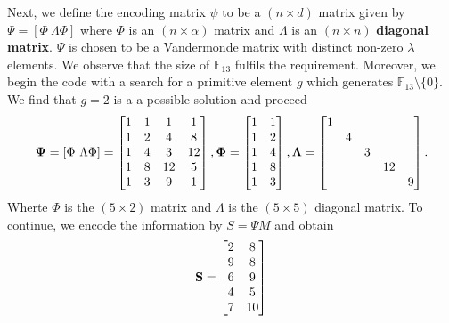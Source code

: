 \documentclass{article}
\begin{document}
Next, we define the encoding matrix $\psi $ to be a $(n\times d)$ matrix given by $\Psi = [\Phi\ \Lambda\Phi]$ where $\Phi$ is an $(n \times \alpha)$ matrix and $\Lambda$ is an $(n\times n)$ \textbf{diagonal matrix}. $\Psi$ is chosen to be a Vandermonde matrix with distinct non-zero $\lambda$ elements. We observe that the size of $\mathbb{F}_{13}$ fulfils the requirement. Moreover, we begin the code with a search for a primitive element $g$ which generates $\mathbb{F}_{13}\setminus\{0\}$. We find that $g=2$ is a a possible solution and proceed
\begin{equation*}
\vb{\Psi} = [\Phi \text{ }\Lambda\Phi] =
\begin{bmatrix}
1 & 1 & 1 & 1 \\
1 & 2 & 4 & 8 \\
1 & 4 & 3 & 12 \\
1 & 8 & 12 & 5 \\
1 & 3 & 9 & 1 
\end{bmatrix}, 
\vb{\Phi} =
\begin{bmatrix}
1 & 1\\
1 & 2\\
1 & 4\\
1 & 8\\
1 & 3
\end{bmatrix},\\
\vb{\Lambda} = 
\begin{bmatrix}
1 & & & & \\
& 4 & & & \\
& & 3 & & \\
& & & 12 & \\
& & & & 9
\end{bmatrix}.
\end{equation*}
Wherte $\Phi$  is the $(5 \times 2)$ matrix and $\Lambda$ is the $(5 \times 5)$ diagonal matrix. To continue, we encode the information by $S=\Psi M$ and obtain
\begin{equation*}
\vb{S} =
\begin{bmatrix}
2 & 8 \\
9 & 8 \\
6 & 9 \\
4 & 5 \\
7 & 10 \\
\end{bmatrix}
\end{equation*}
\end{document}
